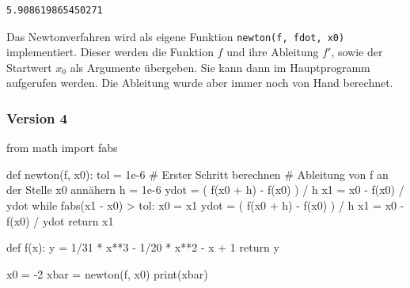 \documentclass[
  letterpaper,
  DIV=11,
  oneside]{scrreprt}
\newenvironment{Shaded}{\begin{snugshade}}{\end{snugshade}}
\newcommand{\BuiltInTok}[1]{\textcolor[rgb]{0.00,0.23,0.31}{#1}}
\newcommand{\CommentTok}[1]{\textcolor[rgb]{0.37,0.37,0.37}{#1}}
\newcommand{\ControlFlowTok}[1]{\textcolor[rgb]{0.00,0.23,0.31}{#1}}
\newcommand{\DecValTok}[1]{\textcolor[rgb]{0.68,0.00,0.00}{#1}}
\newcommand{\FloatTok}[1]{\textcolor[rgb]{0.68,0.00,0.00}{#1}}
\newcommand{\ImportTok}[1]{\textcolor[rgb]{0.00,0.46,0.62}{#1}}
\newcommand{\KeywordTok}[1]{\textcolor[rgb]{0.00,0.23,0.31}{#1}}
\newcommand{\NormalTok}[1]{\textcolor[rgb]{0.00,0.23,0.31}{#1}}
\newcommand{\OperatorTok}[1]{\textcolor[rgb]{0.37,0.37,0.37}{#1}}
\theoremstyle{definition}
\theoremstyle{definition}
\theoremstyle{remark}
\begin{document}
\begin{tcolorbox}
\begin{verbatim}
5.908619865450271
\end{verbatim}

Das Newtonverfahren wird als eigene Funktion
\texttt{newton(f,\ fdot,\ x0)} implementiert. Dieser werden die Funktion
\(f\) und ihre Ableitung \(f'\), sowie der Startwert \(x_0\) als
Argumente übergeben. Sie kann dann im Hauptprogramm aufgerufen werden.
Die Ableitung wurde aber immer noch von Hand berechnet.

\hypertarget{version-4}{%
\subsubsection{Version 4}\label{version-4}}

\begin{Shaded}
\begin{Highlighting}[]
\ImportTok{from}\NormalTok{ math }\ImportTok{import}\NormalTok{ fabs}

\KeywordTok{def}\NormalTok{ newton(f, x0):}
\NormalTok{    tol }\OperatorTok{=} \FloatTok{1e{-}6}
    \CommentTok{\# Erster Schritt berechnen}
    \CommentTok{\# Ableitung von f an der Stelle x0 annähern}
\NormalTok{    h }\OperatorTok{=} \FloatTok{1e{-}6}
\NormalTok{    ydot }\OperatorTok{=}\NormalTok{ ( f(x0 }\OperatorTok{+}\NormalTok{ h) }\OperatorTok{{-}}\NormalTok{ f(x0) ) }\OperatorTok{/}\NormalTok{ h}
\NormalTok{    x1 }\OperatorTok{=}\NormalTok{ x0 }\OperatorTok{{-}}\NormalTok{ f(x0) }\OperatorTok{/}\NormalTok{ ydot}
    \ControlFlowTok{while}\NormalTok{ fabs(x1 }\OperatorTok{{-}}\NormalTok{ x0) }\OperatorTok{\textgreater{}}\NormalTok{ tol:}
\NormalTok{        x0 }\OperatorTok{=}\NormalTok{ x1}
\NormalTok{        ydot }\OperatorTok{=}\NormalTok{ ( f(x0 }\OperatorTok{+}\NormalTok{ h) }\OperatorTok{{-}}\NormalTok{ f(x0) ) }\OperatorTok{/}\NormalTok{ h}
\NormalTok{        x1 }\OperatorTok{=}\NormalTok{ x0 }\OperatorTok{{-}}\NormalTok{ f(x0) }\OperatorTok{/}\NormalTok{ ydot}
    \ControlFlowTok{return}\NormalTok{ x1}

\KeywordTok{def}\NormalTok{ f(x):}
\NormalTok{    y }\OperatorTok{=} \DecValTok{1}\OperatorTok{/}\DecValTok{31} \OperatorTok{*}\NormalTok{ x}\OperatorTok{**}\DecValTok{3} \OperatorTok{{-}} \DecValTok{1}\OperatorTok{/}\DecValTok{20} \OperatorTok{*}\NormalTok{ x}\OperatorTok{**}\DecValTok{2} \OperatorTok{{-}}\NormalTok{ x }\OperatorTok{+} \DecValTok{1}
    \ControlFlowTok{return}\NormalTok{ y}

\NormalTok{x0 }\OperatorTok{=} \OperatorTok{{-}}\DecValTok{2}
\NormalTok{xbar }\OperatorTok{=}\NormalTok{ newton(f, x0)}
\BuiltInTok{print}\NormalTok{(xbar)}
\end{Highlighting}
\end{Shaded}


\end{tcolorbox}
\end{document}
